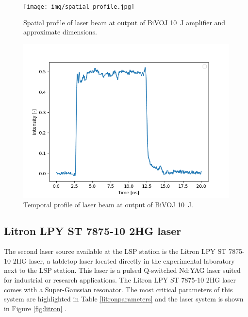\begin{figure}[h]
    \centering
    \texttt{[image: img/spatial\_profile.jpg]}
    \caption{Spatial profile of laser beam at output of BiVOJ \SI{10}{\joule} amplifier and approximate dimensions.}
    \label{fig:spatialprofile}
\end{figure}

\begin{figure}[h]
    \centering
    \includegraphics[width=0.6\linewidth]{img/temporal_profile_bivoj.png}
    \caption{Temporal profile of laser beam at output of BiVOJ \SI{10}{\joule}.}
    \label{fig:temporalprofile}
\end{figure}

\subsection{Litron LPY ST 7875-10 2HG laser}

The second laser source available at the LSP station is the Litron LPY ST 7875-10 2HG laser, a tabletop laser located directly in the experimental laboratory next to the LSP station. This laser is a pulsed Q-switched Nd:YAG laser suited for industrial or research applications. The Litron  LPY ST 7875-10 2HG laser comes with a Super-Gaussian resonator. The most critical parameters of this system are highlighted in Table \ref{litronparameters} and the laser system is shown in Figure \ref{fig:litron} \cite{litron}. 


